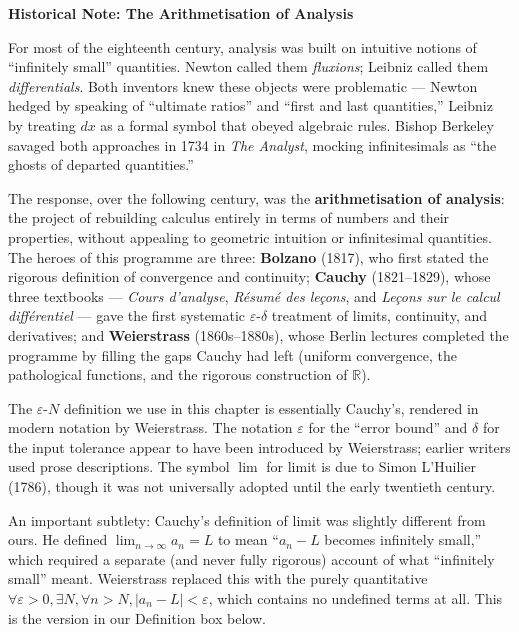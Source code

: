\documentclass[12pt, openany]{book}
\theoremstyle{plain}
\theoremstyle{definition}
\theoremstyle{remark}
\newcommand{\R}{\mathbb{R}}
\begin{document}
\begin{remarkbox}
\textbf{Historical Note: The Arithmetisation of Analysis}

For most of the eighteenth century, analysis was built on intuitive notions of ``infinitely small'' quantities. Newton called them \emph{fluxions}; Leibniz called them \emph{differentials}. Both inventors knew these objects were problematic --- Newton hedged by speaking of ``ultimate ratios'' and ``first and last quantities,'' Leibniz by treating $dx$ as a formal symbol that obeyed algebraic rules. Bishop Berkeley savaged both approaches in 1734 in \emph{The Analyst}, mocking infinitesimals as ``the ghosts of departed quantities.''

The response, over the following century, was the \textbf{arithmetisation of analysis}: the project of rebuilding calculus entirely in terms of numbers and their properties, without appealing to geometric intuition or infinitesimal quantities. The heroes of this programme are three: \textbf{Bolzano} (1817), who first stated the rigorous definition of convergence and continuity; \textbf{Cauchy} (1821--1829), whose three textbooks --- \emph{Cours d'analyse}, \emph{R\'{e}sum\'{e} des le\c{c}ons}, and \emph{Le\c{c}ons sur le calcul diff\'{e}rentiel} --- gave the first systematic $\varepsilon$-$\delta$ treatment of limits, continuity, and derivatives; and \textbf{Weierstrass} (1860s--1880s), whose Berlin lectures completed the programme by filling the gaps Cauchy had left (uniform convergence, the pathological functions, and the rigorous construction of $\R$).

The $\varepsilon$-$N$ definition we use in this chapter is essentially Cauchy's, rendered in modern notation by Weierstrass. The notation $\varepsilon$ for the ``error bound'' and $\delta$ for the input tolerance appear to have been introduced by Weierstrass; earlier writers used prose descriptions. The symbol $\lim$ for limit is due to Simon L'Huilier (1786), though it was not universally adopted until the early twentieth century.

An important subtlety: Cauchy's definition of limit was slightly different from ours. He defined $\lim_{n\to\infty} a_n = L$ to mean ``$a_n - L$ becomes infinitely small,'' which required a separate (and never fully rigorous) account of what ``infinitely small'' meant. Weierstrass replaced this with the purely quantitative $\forall \varepsilon > 0, \exists N, \forall n > N, |a_n - L| < \varepsilon$, which contains no undefined terms at all. This is the version in our Definition box below.
\end{remarkbox}
\color{black}
\end{document}
